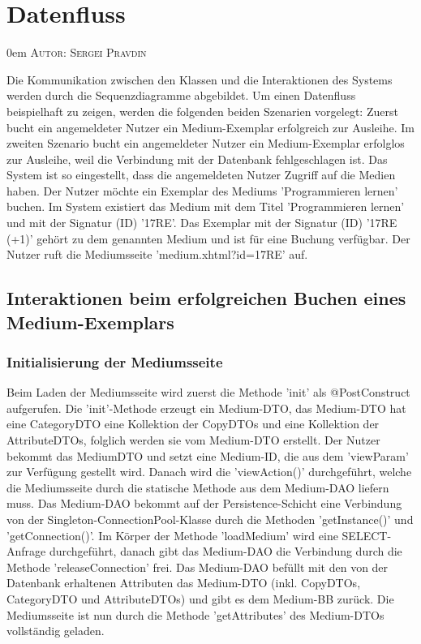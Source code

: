 \documentclass{article}
\makeatletter
\newcommand{\sectionauthor}[1]{
	{\parindent 0em \large \scshape Autor: #1 \par \nobreak \vspace*{1em}}
	\@afterheading
}
\makeatother
\begin{document}
\newpage
\section{Datenfluss}
\sectionauthor{Sergei Pravdin}
Die Kommunikation zwischen den Klassen und die Interaktionen des Systems werden durch die Sequenzdiagramme abgebildet. Um einen Datenfluss beispielhaft zu zeigen, werden die folgenden beiden Szenarien vorgelegt: Zuerst bucht ein angemeldeter Nutzer ein Medium-Exemplar erfolgreich zur Ausleihe. Im zweiten Szenario bucht ein angemeldeter Nutzer ein Medium-Exemplar erfolglos zur Ausleihe, weil die Verbindung mit der Datenbank fehlgeschlagen ist. Das System ist so eingestellt, dass die angemeldeten Nutzer Zugriff auf die Medien haben. Der Nutzer möchte ein Exemplar des Mediums 'Programmieren lernen' buchen. Im System existiert das Medium mit dem Titel 'Programmieren lernen' und mit der Signatur (ID) '17RE'. Das Exemplar mit der Signatur (ID) '17RE (+1)' gehört zu dem genannten Medium und ist für eine Buchung verfügbar. Der Nutzer ruft die Mediumsseite 'medium.xhtml?id=17RE' auf.
\subsection{Interaktionen beim erfolgreichen Buchen eines Medium-Exemplars}
\subsubsection{Initialisierung der Mediumsseite}
Beim Laden der Mediumsseite wird zuerst die Methode 'init' als @PostConstruct aufgerufen. Die 'init'-Methode erzeugt ein Medium-DTO, das Medium-DTO hat eine CategoryDTO eine Kollektion der CopyDTOs und eine Kollektion der AttributeDTOs, folglich werden sie vom Medium-DTO erstellt. Der Nutzer bekommt das MediumDTO und setzt eine Medium-ID, die aus dem 'viewParam' zur Verfügung gestellt wird. Danach wird die 'viewAction()' durchgeführt, welche die Mediumsseite durch die statische Methode aus dem Medium-DAO liefern muss. Das Medium-DAO bekommt auf der Persistence-Schicht eine Verbindung von der Singleton-ConnectionPool-Klasse durch die Methoden 'getInstance()' und 'getConnection()'. Im Körper der Methode 'loadMedium' wird eine SELECT-Anfrage durchgeführt, danach gibt das Medium-DAO die Verbindung durch die Methode 'releaseConnection' frei. Das Medium-DAO befüllt mit den von der Datenbank erhaltenen Attributen das Medium-DTO (inkl. CopyDTOs, CategoryDTO und AttributeDTOs) und gibt es dem Medium-BB zurück. Die Mediumsseite ist nun durch die Methode 'getAttributes' des Medium-DTOs vollständig geladen.
\end{document}
